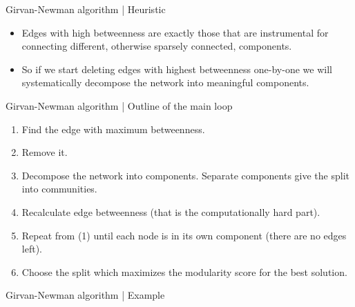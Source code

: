 \documentclass[
    hyperref={colorlinks,linkcolor=blue,urlcolor=blue,citecolor=blue}
]{beamer}
\begin{document}
\begin{frame}{Girvan-Newman algorithm | Heuristic}
\begin{itemize}
    \item<2-> Edges with high betweenness are exactly those that are instrumental
    for connecting different, otherwise sparsely connected, components.
    \item<3-> So if we start deleting edges with highest betweenness one-by-one
    we will systematically decompose the network into meaningful components.
\end{itemize}
\end{frame}

\begin{frame}{Girvan-Newman algorithm | Outline of the main loop}
\begin{enumerate}
    \item Find the edge with maximum betweenness.
    \item Remove it.
    \item Decompose the network into components. Separate components give
    the split into communities.
    \item Recalculate edge betweenness (that is the computationally hard part).
    \item Repeat from (1) until each node is in its own component
    (there are no edges left).
    \item Choose the split which maximizes the modularity score for the
    best solution.
\end{enumerate}
\end{frame}

\begin{frame}{Girvan-Newman algorithm | Example}
\begin{center}
    \end{center}
\end{frame}
\end{document}
